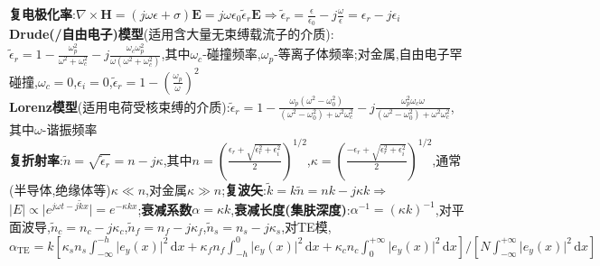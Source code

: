 \documentclass[a4paper,10pt]{article}
\providecommand{\abs}[1]{\lvert#1\rvert}
\begin{document}
\begin{multicols}{2}
\textbf{复电极化率}:$\nabla\times\bm{H}=(j\omega\epsilon+\sigma)\bm{E}=j\omega\epsilon_0\tilde{\epsilon}_r\bm{E}\Rightarrow\tilde{\epsilon}_{r}=\frac{\epsilon}{\epsilon_0}-j\frac{\omega}{\epsilon}=\epsilon_r-j\epsilon_i$\\
\textbf{Drude(/自由电子)模型}(适用含大量无束缚载流子的介质):$\tilde{\epsilon}_r=1-\frac{\omega_p^2}{\omega^2+\omega_c^2}-j\frac{\omega_c\omega_p^2}{\omega(\omega^2+\omega_c^2)}$,其中$\omega_c$-碰撞频率,$\omega_p$-等离子体频率;对金属,自由电子罕碰撞,$\omega_c=0$,$\epsilon_i=0$,$\tilde{\epsilon}_r=1-(\frac{\omega_p}{\omega})^2$\\
\textbf{Lorenz模型}(适用电荷受核束缚的介质):$\tilde{\epsilon}_r=1-\frac{\omega_p(\omega^2-\omega_0^2)}{(\omega^2-\omega_0^2)+\omega^2\omega_c^2}-j\frac{\omega_p^2\omega_c\omega}{(\omega^2-\omega_0^2)+\omega^2\omega_c^2}$,其中$\omega$-谐振频率\\
\textbf{复折射率}:$\tilde{n}=\sqrt{\tilde{\epsilon}_r}=n-j\kappa$,其中$n=(\frac{\epsilon_r+\sqrt{\epsilon_r^2+\epsilon_i^2}}{2})^{1/2}$,$\kappa=(\frac{-\epsilon_r+\sqrt{\epsilon_r^2+\epsilon_i^2}}{2})^{1/2}$,通常(半导体,绝缘体等)$\kappa\ll n$,对金属$\kappa\gg n$;\textbf{复波矢}:$\tilde{k}=k\tilde{n}=nk-j\kappa k\Rightarrow$$\abs{E}\propto\abs{e^{j\omega t-j\tilde{k}x}}=e^{-\kappa kx}$;\textbf{衰减系数}$\alpha=\kappa k$,\textbf{衰减长度(集肤深度)}:$\alpha^{-1}=(\kappa k)^{-1}$,对平面波导,$\tilde{n}_c=n_c-j\kappa_c$,$\tilde{n}_f=n_f-j\kappa_f$,$\tilde{n}_s=n_s-j\kappa_s$,对TE模,$\alpha_{\text{TE}}=k[\kappa_sn_s\int_{-\infty}^{-h}\abs{e_y(x)}^2\,\mathrm{d}x+\kappa_fn_f\int_{-h}^0\abs{e_y(x)}^2\,\mathrm{d}x+\kappa_cn_c\int_0^{+\infty}\abs{e_y(x)}^2\,\mathrm{d}x]/[N\int_{-\infty}^{+\infty}\abs{e_y(x)}^2\,\mathrm{d}x]$\\
$$
\end{multicols}
\end{document}
